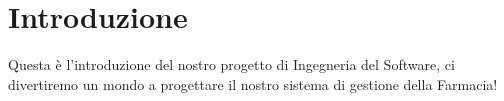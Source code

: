 \section{Introduzione}
Questa è l'introduzione del nostro progetto di Ingegneria del Software, ci divertiremo un mondo a progettare il nostro sistema di gestione della Farmacia!
